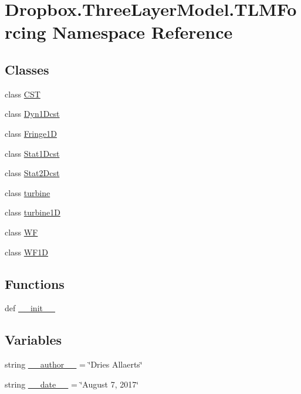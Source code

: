\hypertarget{namespaceDropbox_1_1ThreeLayerModel_1_1TLMForcing}{\section{Dropbox.\+Three\+Layer\+Model.\+T\+L\+M\+Forcing Namespace Reference}
\label{namespaceDropbox_1_1ThreeLayerModel_1_1TLMForcing}
}
\subsection*{Classes}
\begin{DoxyCompactItemize}
\item 
class \hyperlink{classDropbox_1_1ThreeLayerModel_1_1TLMForcing_1_1CST}{C\+S\+T}
\item 
class \hyperlink{classDropbox_1_1ThreeLayerModel_1_1TLMForcing_1_1Dyn1Dcst}{Dyn1\+Dcst}
\item 
class \hyperlink{classDropbox_1_1ThreeLayerModel_1_1TLMForcing_1_1Fringe1D}{Fringe1\+D}
\item 
class \hyperlink{classDropbox_1_1ThreeLayerModel_1_1TLMForcing_1_1Stat1Dcst}{Stat1\+Dcst}
\item 
class \hyperlink{classDropbox_1_1ThreeLayerModel_1_1TLMForcing_1_1Stat2Dcst}{Stat2\+Dcst}
\item 
class \hyperlink{classDropbox_1_1ThreeLayerModel_1_1TLMForcing_1_1turbine}{turbine}
\item 
class \hyperlink{classDropbox_1_1ThreeLayerModel_1_1TLMForcing_1_1turbine1D}{turbine1\+D}
\item 
class \hyperlink{classDropbox_1_1ThreeLayerModel_1_1TLMForcing_1_1WF}{W\+F}
\item 
class \hyperlink{classDropbox_1_1ThreeLayerModel_1_1TLMForcing_1_1WF1D}{W\+F1\+D}
\end{DoxyCompactItemize}
\subsection*{Functions}
\begin{DoxyCompactItemize}
\item 
def \hyperlink{namespaceDropbox_1_1ThreeLayerModel_1_1TLMForcing_a8409e8a6acc0683fd78d8c99653c6d0c}{\+\_\+\+\_\+init\+\_\+\+\_\+}
\end{DoxyCompactItemize}
\subsection*{Variables}
\begin{DoxyCompactItemize}
\item 
string \hyperlink{namespaceDropbox_1_1ThreeLayerModel_1_1TLMForcing_a318d90085457c1a37e389d7f5d6032a6}{\+\_\+\+\_\+author\+\_\+\+\_\+} = \char`\"{}Dries Allaerts\char`\"{}
\item 
string \hyperlink{namespaceDropbox_1_1ThreeLayerModel_1_1TLMForcing_ab87f7e7ab2c5089f05d28b3c8f0d39dd}{\+\_\+\+\_\+date\+\_\+\+\_\+} = \char`\"{}August 7, 2017\char`\"{}
\end{DoxyCompactItemize}


